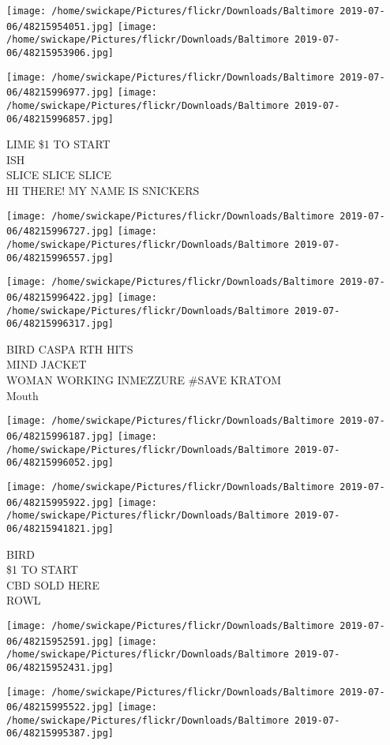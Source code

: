 \documentclass[10pt,letterpaper]{article}
\begin{document}
\texttt{[image: /home/swickape/Pictures/flickr/Downloads/Baltimore 2019-07-06/48215954051.jpg]}
\texttt{[image: /home/swickape/Pictures/flickr/Downloads/Baltimore 2019-07-06/48215953906.jpg]}

\texttt{[image: /home/swickape/Pictures/flickr/Downloads/Baltimore 2019-07-06/48215996977.jpg]}
\texttt{[image: /home/swickape/Pictures/flickr/Downloads/Baltimore 2019-07-06/48215996857.jpg]}

LIME \$1 TO START\\
ISH\\
SLICE SLICE SLICE\\
HI THERE!  MY NAME IS SNICKERS
\pagebreak

\texttt{[image: /home/swickape/Pictures/flickr/Downloads/Baltimore 2019-07-06/48215996727.jpg]}
\texttt{[image: /home/swickape/Pictures/flickr/Downloads/Baltimore 2019-07-06/48215996557.jpg]}

\texttt{[image: /home/swickape/Pictures/flickr/Downloads/Baltimore 2019-07-06/48215996422.jpg]}
\texttt{[image: /home/swickape/Pictures/flickr/Downloads/Baltimore 2019-07-06/48215996317.jpg]}

BIRD CASPA RTH HITS\\
MIND JACKET\\
WOMAN WORKING INMEZZURE \#SAVE KRATOM\\
Mouth
\pagebreak

\texttt{[image: /home/swickape/Pictures/flickr/Downloads/Baltimore 2019-07-06/48215996187.jpg]}
\texttt{[image: /home/swickape/Pictures/flickr/Downloads/Baltimore 2019-07-06/48215996052.jpg]}

\texttt{[image: /home/swickape/Pictures/flickr/Downloads/Baltimore 2019-07-06/48215995922.jpg]}
\texttt{[image: /home/swickape/Pictures/flickr/Downloads/Baltimore 2019-07-06/48215941821.jpg]}

BIRD\\
\$1 TO START\\
CBD SOLD HERE\\
ROWL
\pagebreak

\texttt{[image: /home/swickape/Pictures/flickr/Downloads/Baltimore 2019-07-06/48215952591.jpg]}
\texttt{[image: /home/swickape/Pictures/flickr/Downloads/Baltimore 2019-07-06/48215952431.jpg]}

\texttt{[image: /home/swickape/Pictures/flickr/Downloads/Baltimore 2019-07-06/48215995522.jpg]}
\texttt{[image: /home/swickape/Pictures/flickr/Downloads/Baltimore 2019-07-06/48215995387.jpg]}
\end{document}
